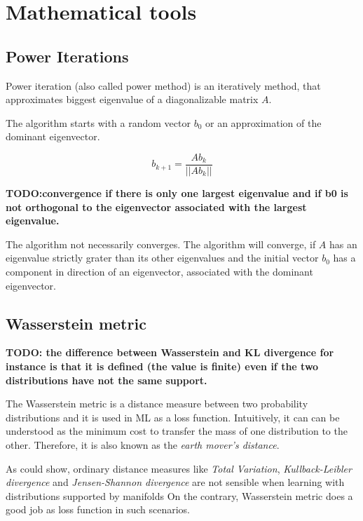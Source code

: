\chapter{Mathematical tools}
\section{Power Iterations}
\label{sec:powerIterations}

Power iteration (also called power method) is an iteratively method, 
that approximates biggest eigenvalue of a diagonalizable matrix $A$.

The algorithm starts with a random vector $b_0$ or an approximation of the dominant eigenvector.

\begin{equation}
    \label{eq:powerIterations}
    b_{k+1} = \frac{Ab_k}{||Ab_k||}
\end{equation}

\textbf{TODO:convergence if there is only one largest eigenvalue and if b0 is not orthogonal to the eigenvector associated with the largest eigenvalue.}

The algorithm not necessarily converges. The algorithm will converge, if $A$ has an eigenvalue strictly grater than its other eigenvalues
and the initial vector $b_0$ has a component in direction of an eigenvector, associated with the dominant eigenvector.

\section{Wasserstein metric}
\label{sec:wasserstein-metric}
\textbf{TODO: the difference between Wasserstein and KL divergence for instance is that it is defined (the value is finite) even if the two distributions have not the same support. }


The Wasserstein metric is a distance measure between two probability distributions and it is used in ML as a loss function\cite{learningWithWasserstein}. 
Intuitively, it can can be understood as the minimum cost to transfer the mass of one distribution to the other.
Therefore, it is also known as the \textit{earth mover's distance}.

As \citet{wassersteinGAN} could show, ordinary distance measures like \textit{Total Variation}, \textit{Kullback-Leibler divergence}
and \textit{Jensen-Shannon divergence} are not sensible when learning with distributions supported by manifolds
On the contrary, Wasserstein metric does a good job as loss function in such scenarios.

